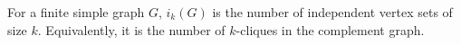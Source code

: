 \begin{definition}
For a finite simple graph \(G\), \(i_k(G)\) is the number of independent vertex sets of size \(k\). Equivalently, it is the number of \(k\)-cliques in the complement graph.
\end{definition}
